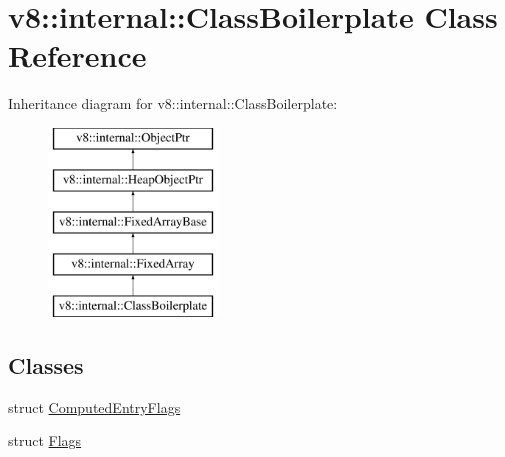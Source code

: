 \hypertarget{classv8_1_1internal_1_1ClassBoilerplate}{}\section{v8\+:\+:internal\+:\+:Class\+Boilerplate Class Reference}
\label{classv8_1_1internal_1_1ClassBoilerplate}
Inheritance diagram for v8\+:\+:internal\+:\+:Class\+Boilerplate\+:\begin{figure}[H]
\begin{center}
\leavevmode
\includegraphics[height=5.000000cm]{classv8_1_1internal_1_1ClassBoilerplate}
\end{center}
\end{figure}
\subsection*{Classes}
\begin{DoxyCompactItemize}
\item 
struct \mbox{\hyperlink{structv8_1_1internal_1_1ClassBoilerplate_1_1ComputedEntryFlags}{Computed\+Entry\+Flags}}
\item 
struct \mbox{\hyperlink{structv8_1_1internal_1_1ClassBoilerplate_1_1Flags}{Flags}}
\end{DoxyCompactItemize}

